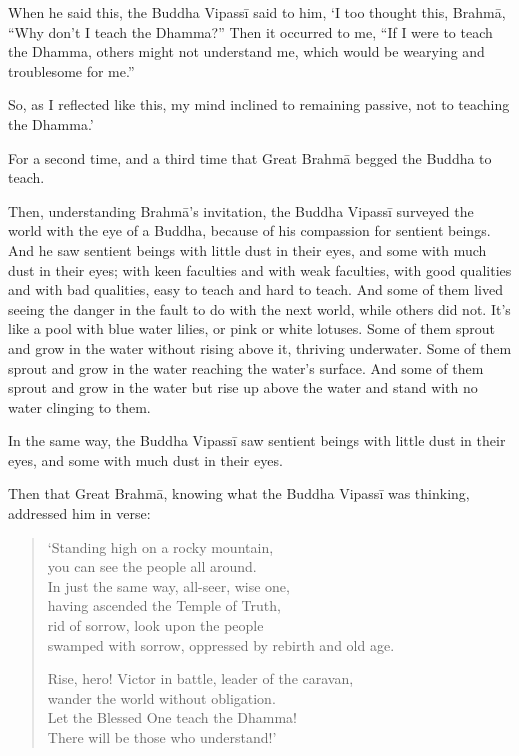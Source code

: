 \documentclass[12pt,openany]{book}%
\begin{document}
When he said this, the Buddha \textsanskrit{Vipassī} said to him, ‘I too thought this, \textsanskrit{Brahmā}, “Why don’t I teach the Dhamma?” Then it occurred to me, “If I were to teach the Dhamma, others might not understand me, which would be wearying and troublesome for me.” 

So, as I reflected like this, my mind inclined to remaining passive, not to teaching the Dhamma.’ 

For a second time, and a third time that Great \textsanskrit{Brahmā} begged the Buddha to teach. 

Then, understanding \textsanskrit{Brahmā}’s invitation, the Buddha \textsanskrit{Vipassī} surveyed the world with the eye of a Buddha, because of his compassion for sentient beings. And he saw sentient beings with little dust in their eyes, and some with much dust in their eyes; with keen faculties and with weak faculties, with good qualities and with bad qualities, easy to teach and hard to teach. And some of them lived seeing the danger in the fault to do with the next world, while others did not. It’s like a pool with blue water lilies, or pink or white lotuses. Some of them sprout and grow in the water without rising above it, thriving underwater. Some of them sprout and grow in the water reaching the water’s surface. And some of them sprout and grow in the water but rise up above the water and stand with no water clinging to them. 

In the same way, the Buddha \textsanskrit{Vipassī} saw sentient beings with little dust in their eyes, and some with much dust in their eyes. 

Then that Great \textsanskrit{Brahmā}, knowing what the Buddha \textsanskrit{Vipassī} was thinking, addressed him in verse: 

\begin{verse}%
‘Standing high on a rocky mountain, \\
you can see the people all around. \\
In just the same way, all-seer, wise one, \\
having ascended the Temple of Truth, \\
rid of sorrow, look upon the people \\
swamped with sorrow, oppressed by rebirth and old age. 

Rise, hero! Victor in battle, leader of the caravan, \\
wander the world without obligation. \\
Let the Blessed One teach the Dhamma! \\
There will be those who understand!’ 

%
\end{verse}
\end{document}
